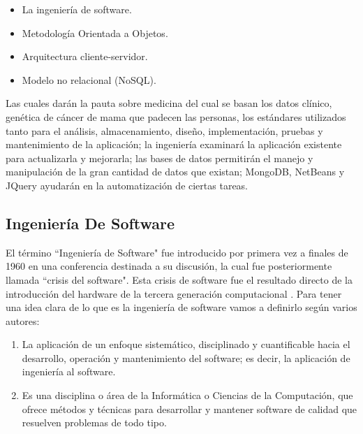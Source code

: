 \documentclass[10pt,a4paper]{article}
\begin{document}
\begin{itemize}
\item La ingenier\'ia de software.

\item Metodolog\'ia Orientada a Objetos.

\item Arquitectura cliente-servidor.

\item Modelo no relacional (NoSQL).
\end{itemize}

Las cuales dar\'an la pauta sobre medicina del cual se basan los datos cl\'inico, gen\'etica de c\'ancer de mama que padecen las personas, los est\'andares utilizados tanto para el an\'alisis, almacenamiento, dise\~no, implementaci\'on, pruebas y mantenimiento de la aplicaci\'on; la ingenier\'ia examinar\'a la aplicaci\'on existente para actualizarla y mejorarla; las bases de datos permitir\'an el manejo y manipulaci\'on de la gran cantidad de datos que existan; MongoDB, NetBeans y JQuery ayudar\'an en la automatizaci\'on de ciertas tareas.

\subsection{Ingeniería De Software}

El t\'ermino ``Ingenier\'ia de Software" fue introducido por primera vez a finales de 1960 en una conferencia destinada a su discusi\'on, la cual fue posteriormente llamada ``crisis del software". Esta crisis de software fue el resultado directo de la introducci\'on del hardware de la tercera generaci\'on computacional \cite{kotonya1998}.
Para tener una idea clara de lo que es la ingenier\'ia de software vamos a definirlo seg\'un varios autores:
\begin{enumerate}

\item {La aplicaci\'on de un enfoque sistem\'atico, disciplinado y cuantificable hacia el desarrollo, operaci\'on y mantenimiento del software; es decir, la aplicaci\'on de ingenier\'ia al software.}
	
\item {Es una disciplina o \'area de la Inform\'atica o Ciencias de la Computaci\'on, que ofrece m\'etodos y t\'ecnicas para desarrollar y mantener software de calidad que resuelven problemas de todo tipo}\cite{pressman1998}.
\end{enumerate}
\end{document}
